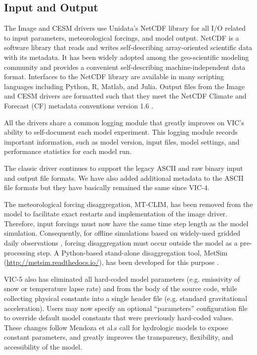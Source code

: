 \documentclass[gmd, manuscript]{copernicus}
\begin{document}
  \subsection{Input and Output}
    \label{sec:io}
    The Image and CESM drivers use Unidata's NetCDF library \citep{Rew_1990} for all I/O related to input parameters, meteorological forcings, and model output. NetCDF is a software library that reads and writes self-describing array-oriented scientific data with its metadata. It has been widely adopted among the geo-scientific modeling community and provides a convenient self-describing machine-independent data format. Interfaces to the NetCDF library are available in many scripting languages including Python, R, Matlab, and Julia. Output files from the Image and CESM drivers are formatted such that they meet the NetCDF Climate and Forecast (CF) metadata conventions version 1.6 \citep{Eaton_2003}.

    All the drivers share a common logging module that greatly improves on VIC's ability to self-document each model experiment. This logging module records important information, such as model version, input files, model settings, and performance statistics for each model run.

    The classic driver continues to support the legacy ASCII and raw binary input and output file formats. We have also added additional metadata to the ASCII file formats but they have basically remained the same since VIC-4.

    The meteorological forcing disaggregation, MT-CLIM, has been removed from the model to facilitate exact restarts and implementation of the image driver. Therefore, input forcings must now have the same time step length as the model simulation.  Consequently, for offline simulations based on widely-used gridded daily observations \citep[e.g.][]{Livneh_2015}, forcing disaggregation must occur outside the model as a pre-processing step.  A Python-based stand-alone disaggregation tool, MetSim (\url{http://metsim.readthedocs.io/}), has been developed for this purpose \citep{Bennett_2018}.

    VIC-5 also has eliminated all hard-coded model parameters (e.g. emissivity of snow or temperature lapse rate) and from the body of the source code, while collecting physical constants into a single header file (e.g. standard gravitational acceleration).
    Users may now specify an optional ``parameters'' configuration file to override default model constants that were previously hard-coded values. These changes follow Mendoza et al.\textquotesingle s \citeyear{Mendoza_2015} call for hydrologic models to expose constant parameters, and greatly improves the transparency, flexibility, and accessibility of the model.
\end{document}
